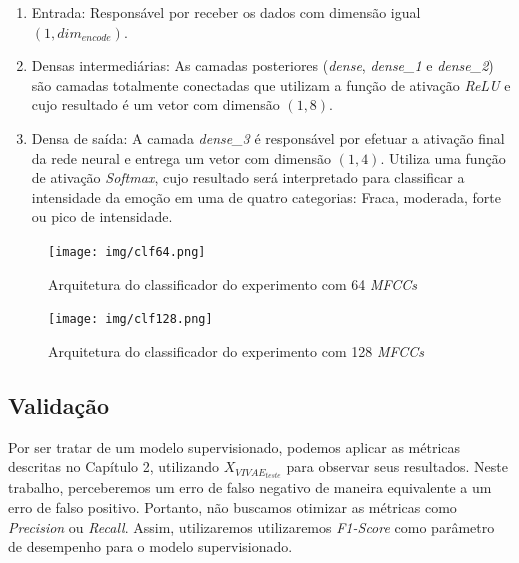 \begin{enumerate}
    \item Entrada: Responsável por receber os dados com dimensão igual $(1, dim_{encode})$.
    \item Densas intermediárias: As camadas posteriores (\textit{dense}, \textit{dense\_1} e \textit{dense\_2}) são camadas totalmente conectadas que utilizam a função de ativação \textit{ReLU} e cujo resultado é um vetor com dimensão $(1, 8)$.
    \item Densa de saída: A camada \textit{dense\_3} é responsável por efetuar a ativação final da rede neural e entrega um vetor com dimensão $(1, 4)$. Utiliza uma função de ativação \textit{Softmax}, cujo resultado será interpretado para classificar a intensidade da emoção em uma de quatro categorias: Fraca, moderada, forte ou pico de intensidade.
\end{enumerate}

\begin{figure}[]
    \centering
    \begin{minipage}[b]{0.45\linewidth}
        \centering
        \texttt{[image: img/clf64.png]}
        \caption{\label{fig:clf64}Arquitetura do classificador do experimento com 64 \textit{MFCCs}}
    \end{minipage}
    \begin{minipage}[b]{0.45\linewidth}
    \centering
        \texttt{[image: img/clf128.png]}
        \caption{\label{fig:clf128}Arquitetura do classificador do experimento com 128 \textit{MFCCs}}
    \end{minipage}
\end{figure}


\subsection{Validação}

Por ser tratar de um modelo supervisionado, podemos aplicar as métricas descritas no Capítulo 2, utilizando $X_{VIVAE_{teste}}$ para observar seus resultados. Neste trabalho, perceberemos um erro de  falso negativo de maneira equivalente a um erro de falso positivo. Portanto, não buscamos otimizar as métricas como \textit{Precision} ou \textit{Recall}. Assim, utilizaremos utilizaremos \textit{F1-Score} como parâmetro de desempenho para o modelo supervisionado.
